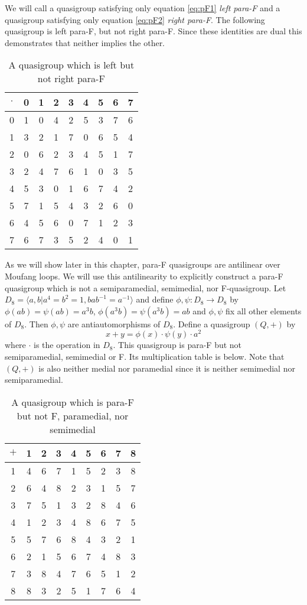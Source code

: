 \documentclass[12pt, twoside, openright]{report}
\theoremstyle{definition}
\begin{document}
We will call a quasigroup satisfying only equation \ref{eq:pF1} \emph{left para-F} and a quasigroup
  satisfying only equation \ref{eq:pF2} \emph{right para-F}. The following quasigroup is left para-F,
  but not right para-F. Since these identities are dual this demonstrates that neither implies the other.

\begin{table}[H]
  \centering
  \begin{tabular}{c | c c c c c c c c}
    $\cdot$ & 0 & 1 & 2 & 3 & 4 & 5 & 6 & 7 \\
    \hline \hline
    0 & 1& 0& 4& 2& 5& 3& 7& 6\\
	  1 & 3& 2& 1& 7& 0& 6& 5& 4\\
	  2 & 0& 6& 2& 3& 4& 5& 1& 7\\
	  3 & 2& 4& 7& 6& 1& 0& 3& 5\\
	  4 & 5& 3& 0& 1& 6& 7& 4& 2\\
	  5 & 7& 1& 5& 4& 3& 2& 6& 0\\
	  6 & 4& 5& 6& 0& 7& 1& 2& 3\\
	  7 & 6& 7& 3& 5& 2& 4& 0& 1
  \end{tabular}
  \caption{A quasigroup which is left but not right para-F}
\end{table}

As we will show later in this chapter, para-F quasigroups are antilinear over Moufang loops. We will
  use this antilinearity to explicitly construct a para-F quasigroup which is not a semiparamedial,
  semimedial, nor F-quasigroup. Let $D_8 = \langle a, b | a^4 = b^2 = 1, bab^{-1} = a^{-1}\rangle$
  and define $\phi, \psi : D_8\to D_8$ by 
  $\phi(ab) = \psi(ab) = a^3 b$, $\phi(a^3 b) = \psi(a^3 b) = ab$ and $\phi, \psi$ fix all other
  elements of $D_8$. Then $\phi, \psi$ are antiautomorphisms of $D_8$. Define a quasigroup $(Q, +)$ by
\[x + y = \phi(x) \cdot \psi(y) \cdot a^2\]
where $\cdot$ is the operation in $D_8$. This quasigroup is para-F but not semiparamedial, semimedial or F.
  Its multiplication table is below. Note that $(Q, +)$ is also neither medial nor paramedial since it is
  neither semimedial nor semiparamedial.

\begin{table}[H]
  \centering
  \begin{tabular}{c | c c c c c c c c}
    $+$ & 1 & 2 & 3 & 4 & 5 & 6 & 7 & 8\\
    \hline \hline
    1& 4& 6& 7& 1& 5& 2& 3& 8\\
    2& 6& 4& 8& 2& 3& 1& 5& 7\\
    3& 7& 5& 1& 3& 2& 8& 4& 6\\
    4& 1& 2& 3& 4& 8& 6& 7& 5\\
    5& 5& 7& 6& 8& 4& 3& 2& 1\\
    6& 2& 1& 5& 6& 7& 4& 8& 3\\
    7& 3& 8& 4& 7& 6& 5& 1& 2\\
    8& 8& 3& 2& 5& 1& 7& 6& 4 
  \end{tabular}
  \caption{A quasigroup which is para-F but not F, paramedial, nor semimedial}
\end{table}
\end{document}
